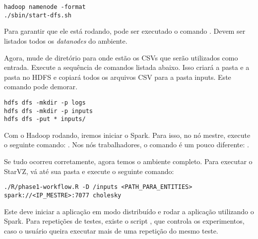 \small
\begin{lstlisting}
hadoop namenode -format
./sbin/start-dfs.sh
\end{lstlisting}
\normalsize

Para garantir que ele está rodando, pode ser executado o comando . Devem ser listados todos os \emph{datanodes} do ambiente.

Agora, mude de diretório para onde estão os CSVs que serão utilizados como 
entrada. Execute a sequência de comandos listada abaixo. Isso criará a pasta 
 e a pasta  no HDFS e copiará todos os arquivos 
CSV para a pasta inputs. Este comando pode demorar.

\small
\begin{lstlisting}
hdfs dfs -mkdir -p logs
hdfs dfs -mkdir -p inputs
hdfs dfs -put * inputs/
\end{lstlisting}


Com o Hadoop rodando, iremos iniciar o Spark. Para isso, no nó mestre, execute 
o seguinte comando: . Nos nós trabalhadores, o 
comando é um pouco diferente: .

Se tudo ocorreu corretamente, agora temos o ambiente completo. Para executar o 
StarVZ, vá até sua pasta e execute o seguinte comando: 

\small
\begin{lstlisting}
./R/phase1-workflow.R -D /inputs <PATH_PARA_ENTITIES> 
spark://<IP_MESTRE>:7077 cholesky
\end{lstlisting}
\normalsize

Este deve iniciar a aplicação em modo distribuído e rodar a aplicação 
utilizando o Spark. Para repetições de testes, existe o script 
, que controla os experimentos, caso o 
usuário queira executar mais de uma repetição do mesmo teste.